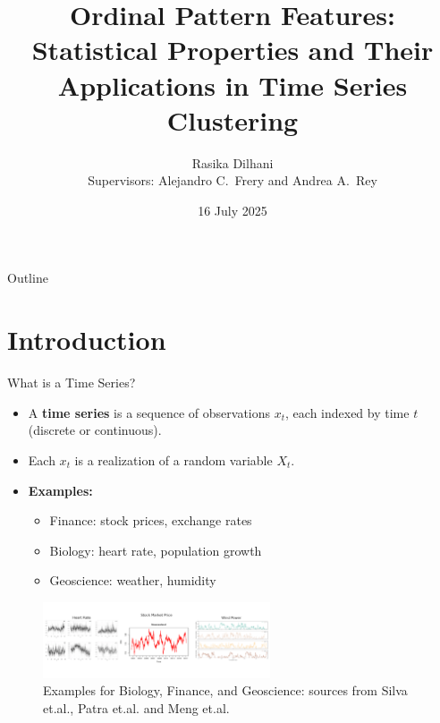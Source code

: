 \documentclass{beamer}
\title{Ordinal Pattern Features: Statistical Properties and Their Applications in Time Series Clustering}
\author[Rasika Dilhani]{{Rasika Dilhani}\\{\small Supervisors: Alejandro C.\ Frery and Andrea A.\ Rey}}
\institute[VUW]{Victoria University of Wellington}
\date{16 July 2025}
\begin{document}
\maketitle
\begin{frame}{Outline}
    \tableofcontents
\end{frame}

\section{Introduction}

\begin{frame}{What is a Time Series?}
	\begin{itemize}
		\item A \textbf{time series} is a sequence of observations $x_t$, each indexed by time $t$ (discrete or continuous).
		\item Each $x_t$ is a realization of a random variable $X_t$.
		\item \textbf{Examples:}
		\begin{itemize}
			\item Finance: stock prices, exchange rates
			\item Biology: heart rate, population growth
			\item Geoscience: weather, humidity
		\end{itemize}
		\end{itemize}
		\begin{figure}[hbt]
			\centering
			\includegraphics[width=0.6\textwidth]{time series plots}
			\caption{Examples for Biology, Finance, and Geoscience: sources from Silva et.al., Patra et.al. and Meng et.al.~\cite{Silva2023,Patra2022,Meng2023}}
			\label{fig:timeseries}
		\end{figure}	
\end{frame}
\end{document}
